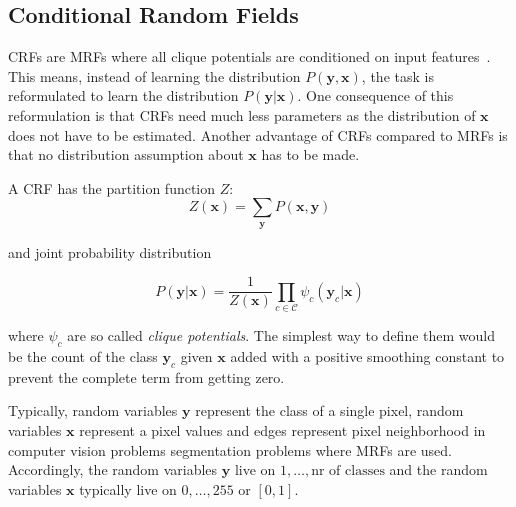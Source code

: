 






\subsection{Conditional Random Fields}\label{subsec:conditional-random-fields}

\Glspl{CRF} are \glspl{MRF} where all clique potentials are conditioned on
input features~\cite{murphy2012machine}. This means, instead of learning the
distribution $P(\mathbf{y}, \mathbf{x})$, the task is reformulated to learn the
distribution $P(\mathbf{y}| \mathbf{x})$. One consequence of this reformulation
is that \glspl{CRF} need much less parameters as the distribution of
$\mathbf{x}$ does not have to be estimated. Another advantage of \glspl{CRF}
compared to \glspl{MRF} is that no distribution assumption about $\mathbf{x}$
has to be made.

A \gls{CRF} has the partition function $Z$:
\[Z(\mathbf{x}) = \sum_{\mathbf{y}} P(\mathbf{x}, \mathbf{y})\]

and joint probability distribution

\[P(\mathbf{y} | \mathbf{x}) = \frac{1}{Z(\mathbf{x})} \prod_{c \in \mathcal{C}} \psi_c(\mathbf{y}_c | \mathbf{x})\]

where $\psi_c$ are so called \textit{clique potentials}. The simplest way to
define them would be the count of the class $\mathbf{y}_c$ given $\mathbf{x}$
added with a positive smoothing constant to prevent the complete term from
getting zero.

Typically, random variables $\mathbf{y}$ represent the class of a single pixel,
random variables $\mathbf{x}$ represent a pixel values and edges represent
pixel neighborhood in computer vision problems segmentation problems where
\glspl{MRF} are used. Accordingly, the random variables $\mathbf{y}$ live on
$1, \dots, \text{nr of classes}$ and the random variables $\mathbf{x}$
typically live on $0, \dots, 255$ or $[0, 1]$.

